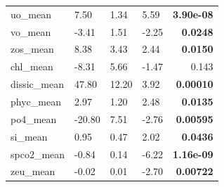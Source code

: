 \documentclass[a4paper,fleqn]{cas-sc}
\begin{document}
\begin{table}[width=\linewidth,cols=5,pos=!htbp]
\begin{tabular*}{\tblwidth}{@{} LLLL R @{}}
uo\_mean       & 7.50      & 1.34      & 5.59  & \textbf{3.90e-08} \\
vo\_mean       & -3.41     & 1.51      & -2.25 & \textbf{0.0248} \\
zos\_mean      & 8.38      & 3.43      & 2.44  & \textbf{0.0150} \\
chl\_mean      & -8.31     & 5.66      & -1.47 & 0.143 \\
dissic\_mean   & 47.80     & 12.20     & 3.92  & \textbf{0.00010} \\
phyc\_mean     & 2.97      & 1.20      & 2.48  & \textbf{0.0135} \\
po4\_mean      & -20.80    & 7.51      & -2.76 & \textbf{0.00595} \\
si\_mean       & 0.95      & 0.47      & 2.02  & \textbf{0.0436} \\
spco2\_mean    & -0.84     & 0.14      & -6.22 & \textbf{1.16e-09} \\
zeu\_mean      & -0.02     & 0.01      & -2.70 & \textbf{0.00722} \\
\bottomrule
\end{tabular*}
\label{tab:5}
\end{table}
\end{document}
